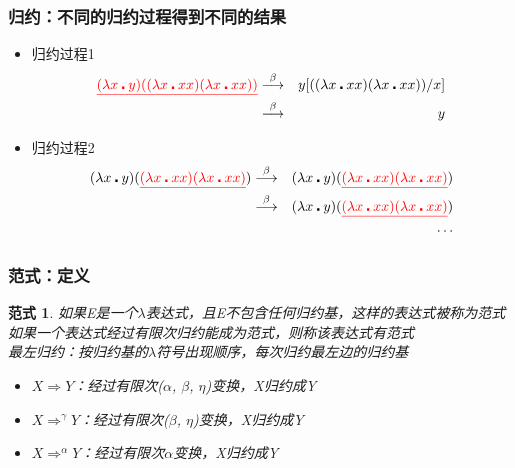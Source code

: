 \documentclass[CJKutf8,compress,hyperref]{beamer}
\begin{document}
\begin{CJK}{UTF8}{song}
\begin{frame}
  \frametitle{归约：不同的归约过程得到不同的结果} 
  \label{ambig}
  \begin{itemize}
  \item 归约过程1 
    \begin{eqnarray*}
      {\color{red}\underline{(\lambda x \centerdot y) ((\lambda x \centerdot xx) (\lambda x \centerdot xx))}}  &  \stackrel{\beta}{\longrightarrow} & y[((\lambda x \centerdot xx) (\lambda x \centerdot xx))/x] \\
                                                                                                               &   \stackrel{\beta}{\longrightarrow} & y 
    \end{eqnarray*} 
  \item 归约过程2 
    \begin{eqnarray*}
      (\lambda x \centerdot y) ({\color{red}\underline{(\lambda x \centerdot xx) (\lambda x \centerdot xx)}}) &  \stackrel{\beta}{\longrightarrow} & (\lambda x \centerdot y) ({\color{red}\underline{(\lambda x \centerdot xx) (\lambda x \centerdot xx)}})  \\ 
                                                                                                              &  \stackrel{\beta}{\longrightarrow} & (\lambda x \centerdot y) ({\color{red}\underline{(\lambda x \centerdot xx) (\lambda x \centerdot xx)}}) \\  
                                                                                                              & & \cdots
    \end{eqnarray*} 
  \end{itemize}  
\end{frame}

\begin{frame}
  \frametitle{范式：定义} 
  \newtheorem{Paradigm}{范式} 
  \begin{Paradigm}
    如果E是一个$\lambda$表达式，且E不包含任何归约基，这样的表达式被称为{\color{red}范式} \\ 
    如果一个表达式经过有限次归约能成为范式，则称该表达式有范式 \\ 
    最左归约：按归约基的$\lambda$符号出现顺序，每次归约最左边的归约基 
    \begin{itemize}
    \item $X \Rightarrow Y$：经过有限次($\alpha$, $\beta$, $\eta$)变换，X归约成Y
    \item $X \Rightarrow^\gamma Y$：经过有限次($\beta$, $\eta$)变换，X归约成Y
    \item $X \Rightarrow^\alpha Y$：经过有限次$\alpha$变换，X归约成Y
    \end{itemize}
  \end{Paradigm} 
\end{frame} 


\end{CJK}
\end{document}
